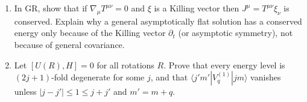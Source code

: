 \documentclass[11pt,a4paper,openany]{book}
\theoremstyle{definition}
\theoremstyle{plain}
\theoremstyle{remark}
\DeclareRobustCommand{\hbar}{\hslash}
\newcommand{\ii}{\mathrm{i}}
\DeclareMathOperator{\tr}{tr}
\begin{document}
\begin{enumerate}[leftmargin=2.2em,itemsep=4pt,label=\textbf{P\thechapter.\arabic*}]
  Verify \eqref{eq:covder} and $[D_\mu,D_\nu]\psi=\tfrac{\ii q}{\hbar c}F_{\mu\nu}\psi$.
  For the non-Abelian case show that $F_{\mu\nu}\to UF_{\mu\nu}U^{-1}$ and that
  $\tr F_{\mu\nu}F^{\mu\nu}$ is invariant.
\item In GR, show that if $\nabla_\mu T^{\mu\nu}=0$ and $\xi$ is a Killing vector
  then $J^\mu=T^{\mu\nu}\xi_\nu$ is conserved. Explain why a general
  asymptotically flat solution has a conserved energy only because of the
  Killing vector $\partial_t$ (or asymptotic symmetry), not because of
  general covariance.
\item Let $[U(R),H]=0$ for all rotations $R$. Prove that every energy level is
  $(2j+1)$-fold degenerate for some $j$, and that
  $\langle j'm'|V_q^{(1)}|jm\rangle$ vanishes unless
  $|j-j'|\le1\le j+j'$ and $m'=m+q$.
\end{enumerate}

\end{document}
